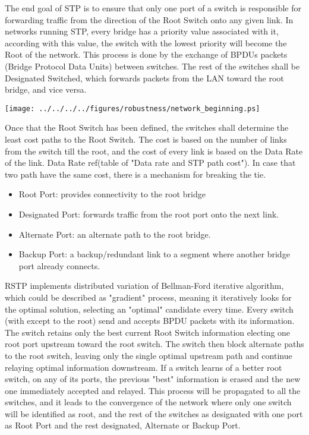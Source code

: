 The end goal of STP is to ensure that only one port of a switch is responsible 
for forwarding traffic from the direction of the Root Switch onto any given
link. In networks running STP, every bridge has a priority value associated with
it, according with this value, the switch with the lowest priority will become
the Root of the network.  This process is done by the exchange of BPDUs packets
(Bridge Protocol Data Units) between switches. The rest of the switches shall be
Designated Switched, which forwards packets from the LAN toward the root bridge,
and vice versa.

\begin{center}
        \texttt{[image: ../../../../figures/robustness/network\_beginning.ps]}
        \label{fig:redunt_net}
\end{center}


Once that the Root Switch has been defined, the switches shall determine
the least cost paths to the Root Switch. The cost is based on the number of
links from the switch till the root, and the cost of every link is based on the
Data Rate of the link. Data Rate ref(table of "Data rate and STP path cost"). In
case that two path have the same cost, there is a mechanism for breaking the
tie.

\begin{itemize}
        \item Root Port: provides connectivity to the root bridge
        \item Designated Port: forwards traffic from the root port onto the
next link.
        \item Alternate Port: an alternate path to the root bridge.
        \item Backup Port: a backup/redundant link to a segment where
another bridge port already connects.
\end{itemize}


RSTP implements distributed variation of Bellman-Ford iterative
algorithm, which could be described as "gradient" process, meaning it iteratively looks for the
optimal solution, selecting an "optimal" candidate every time. Every switch
(with except to the root) send and  accepts BPDU packets
with its information. The switch retains only the best current Root Switch
information electing one root port upstream toward the root switch. The switch
then block alternate paths to the root switch, leaving only the single optimal
upstream path and continue relaying optimal information downstream. If a switch
learns of a better root switch, on any of its ports, the previous "best"
information is erased and the new one immediately accepted and relayed. This
process will be propagated to all the switches, and it leads to the convergence
of the network where only one switch will be identified as root, and the rest of
the switches as designated with one port as Root Port and the rest designated,
Alternate or Backup Port.


